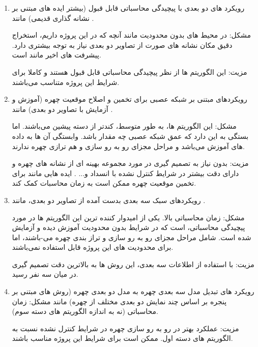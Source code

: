 \begin{enumerate}
\item
رویکرد های دو بعدی با پیچیدگی محاسباتی قابل قبول (بیشتر ایده های مبتنی بر نشانه گذاری  قدیمی) مانند 
\cite{HAGHIGHAT201623, LV2016465, amos2016openface, 6196234}.

\noindent
مشکل: در محیط های بدون محدودیت مانند آنچه که در این پروژه داریم، استخراج دقیق مکان نشانه های صورت از تصاویر دو بعدی نیاز به توجه بیشتری دارد. پیشرفت های اخیر مانند \cite{HAGHIGHAT201623} است.

\noindent
مزیت: این الگوریتم ها از نظر پیچیدگی محاسباتی  قابل قبول هستند و کاملا برای شرایط این پروژه متناسب می‌باشند.
\item 
رویکردهای مبتنی بر شبکه عصبی برای تخمین و اصلاح موقعیت چهره (آموزش و آزمایش با تصاویر دو بعدی) مانند 
\cite{wu2016facial, 7477555, 7780892, 7532959, 7298667}.

\noindent
مشکل: این الگوریتم ها، به طور متوسط، کندتر از دسته پیشین می‌باشند. اما بستگی به این دارد که عمق شبکه عصبی چه مقدار باشد. وابستگی آن ها به داده های آموزش می‌باشد و مراحل مجزای رو به رو سازی و هم ترازی چهره ندارند.

\noindent
مزیت: بدون نیاز به تصمیم گیری در مورد مجموعه بهینه ای از نشانه های چهره و دارای دقت بیشتر در شرایط کنترل نشده با انسداد و... . ایده هایی مانند \cite{Martino2015} برای تخمین موقعیت چهره ممکن است به زمان محاسبات کمک کند.
\item

رویکردهای سبک سه بعدی بدست آمده از تصاویر دو بعدی، مانند 
\cite{HU2017366, hassner2014effective, 7298679, 7006757, 6905796}.

\noindent
مشکل: زمان محاسباتی بالا. یکی از امیدوار کننده ترین این الگوریتم ها در مورد پیچیدگی محاسباتی، \cite{hassner2014effective} است که در شرایط بدون محدودیت آموزش دیده و آزمایش شده است. شامل مراحل مجزای رو به رو سازی و تراز بندی چهره می-باشند، اما برای محدودیت های این پروژه قابل استفاده نمی‌باشند.

\noindent
مزیت: با استفاده از اطلاعات سه بعدی، این روش ها به بالاترین دقت تصمیم گیری در میان سه نفر رسید.
\item
رویکرد های تبدیل مدل سه بعدی چهره به مدل دو بعدی چهره (روش های مبتنی بر پنجره  بر اساس چند نمایش دو بعدی مختلف از چهره) مانند \cite{DING2017144}
\noindent
مشکل: زمان محاسباتی (نه به اندازه الگوریتم های دسته سوم). 

\noindent
مزیت: عملکرد بهتر در رو به رو سازی چهره در شرایط کنترل نشده نسبت به الگوریتم های دسته اول. ممکن است برای شرایط این پروژه مناسب باشند.
\end{enumerate}

